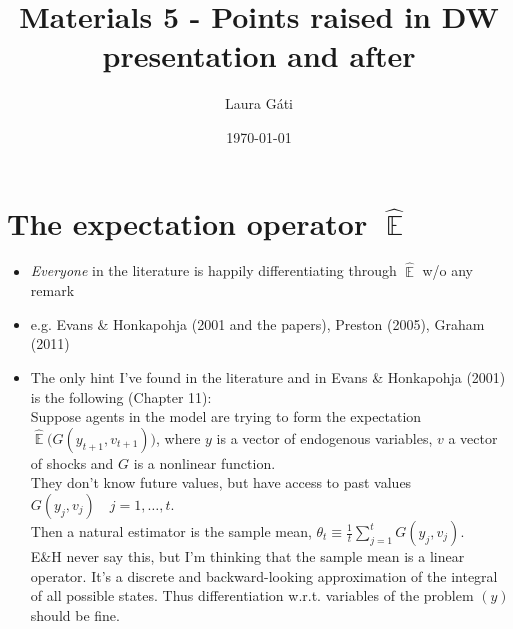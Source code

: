 \documentclass[11pt]{article}
\renewcommand{\[}{\begin{equation}}
\renewcommand{\]}{\end{equation}}
\DeclareMathOperator{\E}{\mathbb{E}}
\begin{document}
\linespread{1.0}

\title{Materials 5 - Points raised in DW presentation and after}
\author{Laura G\'ati} 
\date{\today}
\maketitle


\tableofcontents



\section{The expectation operator $\hat{\E}$}

	\begin{itemize}
	\item \emph{Everyone} in the literature is happily differentiating through $\hat{\E}$ w/o any remark
	\item[] e.g. Evans \& Honkapohja (2001 and the papers), Preston (2005), Graham (2011)
	\item The only hint I've found in the literature and in  Evans \& Honkapohja (2001) is the following (Chapter 11): \\
	Suppose agents in the model are trying to form the expectation $\hat{\E}\big(G(y_{t+1},v_{t+1}) \big)$, where $y$ is a vector of  endogenous variables, $v$ a vector of shocks and $G$ is a nonlinear function.\\
	They don't know future values, but have access to past values $G(y_{j},v_{j}) \quad j=1,\dots,t$. \\
	Then a natural estimator is the sample mean, $\theta_t \equiv \frac{1}{t} \sum_{j=1}^t G(y_{j},v_{j}) $. \\
	E\&H never say this, but I'm thinking that the sample mean is a linear operator. It's a discrete and backward-looking approximation of the integral of all possible states. Thus differentiation w.r.t. variables of the problem $(y)$ should be fine.
	\end{itemize}
\end{document}
